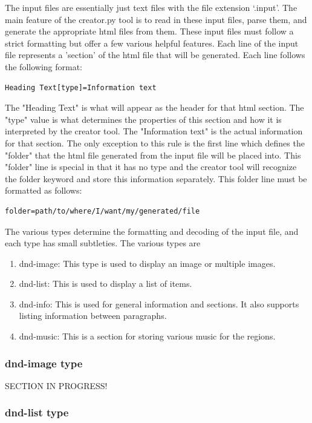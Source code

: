 The input files are essentially just text files with the file extension `.input'. The main feature of the creator.py tool is to read in these input files, parse them, and generate the appropriate html files from them. These input files must follow a strict formatting but offer a few various helpful features. Each line of the input file represents a 'section' of the html file that will be generated. Each line follows the following format:
\begin{lstlisting}
Heading Text[type]=Information text
\end{lstlisting}
The "Heading Text" is what will appear as the header for that html section. The "type" value is what determines the properties of this section and how it is interpreted by the creator tool. The "Information text" is the actual information for that section. The only exception to this rule is the first line which defines the "folder" that the html file generated from the input file will be placed into. This "folder" line is special in that it has no type and the creator tool will recognize the folder keyword and store this information separately. This folder line must be formatted as follows:
\begin{lstlisting}
folder=path/to/where/I/want/my/generated/file
\end{lstlisting}
The various types determine the formatting and decoding of the input file, and each type has small subtleties. The various types are
\begin{enumerate}
	\item dnd-image: This type is used to display an image or multiple images.
 	\item dnd-list: This is used to display a list of items.
 	\item dnd-info: This is used for general information and sections. It also supports listing information between paragraphs.
  	\item dnd-music: This is a section for storing various music for the regions.
\end{enumerate}

\subsubsection{dnd-image type}

SECTION IN PROGRESS!

\subsubsection{dnd-list type}

